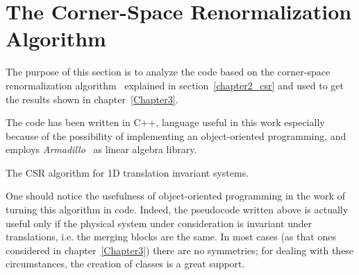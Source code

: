 \chapter{The Corner-Space Renormalization Algorithm} %
\label{AppendixA}

The purpose of this section is to analyze the code based on the corner-space renormalization algorithm~\cite{PhysRevLett.115.080604} explained in section~\ref{chapter2_csr} and used to get the results shown in chapter~\ref{Chapter3}.

The code has been written in C++, language useful in this work especially because of the possibility of implementing an object-oriented programming, and employs \emph{Armadillo}~\cite{arma:book, arma:art} as linear algebra library. 
\medskip

\begin{algorithm}[H]
\label{algo_trans_inv}
\SetAlgoLined
\DontPrintSemicolon
{}
\bigskip
{}

\caption{The CSR algorithm for 1D translation invariant systems.}
\label{pseudocode}
\end{algorithm}

One should notice the usefulness of object-oriented programming in the work of turning this algorithm in code. Indeed, the pseudocode written above is actually useful only if the physical system under consideration is invariant under translations, i.e. the merging blocks are the same. In most cases (as that ones considered in chapter~\ref{Chapter3}) there are no symmetries; for dealing with these circumstances, the creation of classes is a great support.

